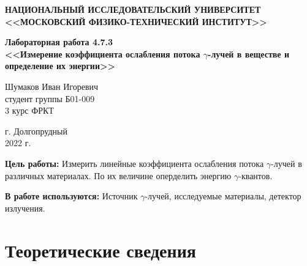 \documentclass[a4paper,12pt]{article} %
\begin{document}
	
	
	\begin{center}
		
		\textbf{НАЦИОНАЛЬНЫЙ ИССЛЕДОВАТЕЛЬСКИЙ УНИВЕРСИТЕТ \\ <<МОСКОВСКИЙ ФИЗИКО-ТЕХНИЧЕСКИЙ ИНСТИТУТ>>}
		\vspace{13ex}
		
		\textbf{Лабораторная работа 4.7.3\\ <<Измерение коэффициента ослабления потока $\gamma$-лучей в веществе и определение их энергии>>}
		\vspace{40ex}
		
		\normalsize{Шумаков Иван Игоревич \\ студент группы Б01-009\\ 3 курс ФРКТ\\}
	\end{center}
	
	\vfill 
	
	\begin{center}
		г. Долгопрудный\\ 
		2022 г.
	\end{center}
	
	
	\thispagestyle{empty} %
	\newpage


	\textbf{Цель работы:} Измерить линейные коэффициента ослабления потока $\gamma$-лучей в различных материалах. По их величине оперделить энергию $\gamma$-квантов.\par
    \textbf{В работе используются:} Источник $\gamma$-лучей, исследуемые материалы, детектор излучения.\par
    
    
	\section{Теоретические сведения}
\end{document}
